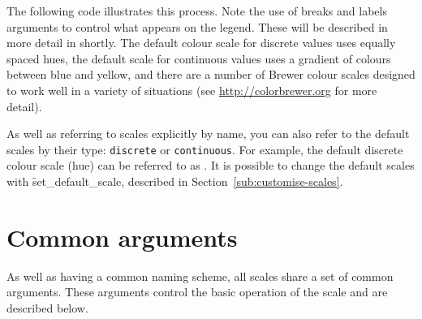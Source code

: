 The following code illustrates this process.  Note the use of breaks and labels arguments to control what appears on the legend.  These will be described in more detail in shortly. The default colour scale for discrete values uses equally spaced hues, the default scale for continuous values uses a gradient of colours between blue and yellow, and there are a number of Brewer colour scales designed to work well in a variety of situations (see \url{http://colorbrewer.org} for more detail).

% 


As well as referring to scales explicitly by name, you can also refer to the default scales by their type:  {\tt discrete} or {\tt continuous}.  For example, the default discrete colour scale (hue) can be referred to as .  It is possible to change the default scales with \f{set_default_scale}, described in Section~\ref{sub:customise-scales}.


\section{Common arguments}
\label{sec:scale-arguments}

As well as having a common naming scheme, all scales share a set of common arguments.  These arguments control the basic operation of the scale and are described below.


